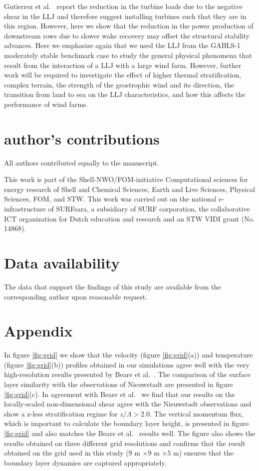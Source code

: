 \documentclass[%
 aip,
 amsmath,amssymb,
preprint,%
author-numerical,%
]{revtex4-1}
\begin{document}
Gutierrez et al.\ \cite{gut17} report the reduction in the turbine loads due to the negative shear in the LLJ and therefore suggest installing turbines such that they are in this region. However, here we show that the reduction in the power production of downstream rows due to slower wake recovery may offset the structural stability advances. Here we emphasize again that we used the LLJ from the GABLS-1 moderately stable benchmark case to study the general physical phenomena that result from the interaction of a LLJ with a large wind farm. However, further work will be required to investigate the effect of higher thermal stratification, complex terrain, the strength of the geostrophic wind and its direction, the transition from land to sea on the LLJ characteristics, and how this affects the performance of wind farms.

\section*{author's contributions}
\noindent All authors contributed equally to the manuscript.  

\begin{acknowledgments}
This work is part of the Shell-NWO/FOM-initiative Computational sciences for energy research of Shell and Chemical Sciences, Earth and Live Sciences, Physical Sciences, FOM, and STW. This work was carried out on the national e-infrastructure of SURFsara, a subsidiary of SURF corporation, the collaborative ICT organization for Dutch education and research and an STW VIDI grant (No. 14868).
\end{acknowledgments}

\section*{Data availability}
\noindent The data that support the findings of this study are available from the corresponding author upon reasonable request.

\section*{Appendix}
In figure \ref{fig:grid} we show that the velocity (figure \ref{fig:grid}(a)) and temperature (figure \ref{fig:grid}(b)) profiles obtained in our simulations agree well with the very high-resolution results presented by Beare et al.\ \cite{bea06}. The comparison of the surface layer similarity with the observations of Nieuwstadt \cite{nie84} are presented in figure \ref{fig:grid}(c). In agreement with Beare et al.\ \cite{bea06} we find that our results on the locally-scaled non-dimensional shear agree with the Nieuwstadt \cite{nie84} observations and show a z-less stratification regime for $z/\Lambda > 2.0$. The vertical momentum flux, which is important to calculate the boundary layer height, is presented in figure \ref{fig:grid} and also matches the Beare et al.\ \cite{bea06} results well. The figure also shows the results obtained on three different grid resolutions and confirms that the result obtained on the grid used in this study ($9$ m $\times9$ m $\times5$ m) ensures that the boundary layer dynamics are captured appropriately.
\end{document}
